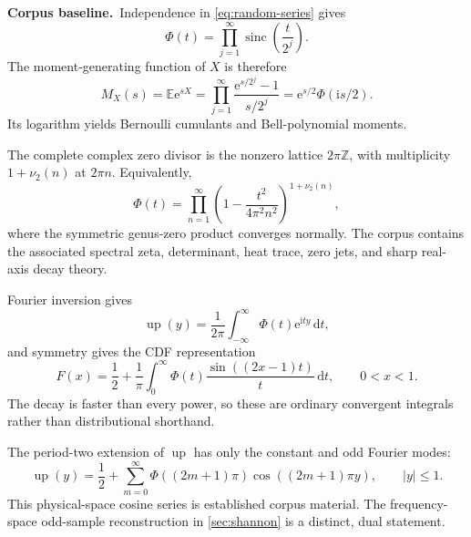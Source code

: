 \documentclass[11pt,oneside]{article}
\theoremstyle{definition}
\theoremstyle{remark}
\newcommand{\Z}{\mathbb Z}
\newcommand{\E}{\mathbb E}
\newcommand{\Up}{\operatorname{up}}
\newcommand{\sinc}{\operatorname{sinc}}
\newcommand{\dd}{\,\mathrm d}
\newcommand{\ii}{\mathrm i}
\newcommand{\e}{\mathrm e}
\newcommand{\vtwo}{\nu_2}
\newcommand{\1}{\mathbf 1}
\newcommand{\baseline}{\textcolor{linkblue}{\textbf{Corpus baseline.}}\ }
\begin{document}
\baseline Independence in \eqref{eq:random-series} gives
\begin{equation}
 \boxed{\displaystyle
 \Phi(t)=\prod_{j=1}^\infty\sinc\!\left(\frac{t}{2^j}\right).}
                                                               \label{eq:sinc-product}
\end{equation}
The moment-generating function of $X$ is therefore
\begin{equation}
 M_X(s)=\E\e^{sX}
 =\prod_{j=1}^\infty\frac{\e^{s/2^j}-1}{s/2^j}
 =\e^{s/2}\Phi(\ii s/2).                                \label{eq:mgf-product}
\end{equation}
Its logarithm yields Bernoulli cumulants and Bell-polynomial moments.

The complete complex zero divisor is the nonzero lattice $2\pi\Z$, with
multiplicity $1+\vtwo(n)$ at $2\pi n$.  Equivalently,
\begin{equation}
 \Phi(t)=\prod_{n=1}^\infty
 \left(1-\frac{t^2}{4\pi^2n^2}\right)^{1+\vtwo(n)},     \label{eq:canonical-product}
\end{equation}
where the symmetric genus-zero product converges normally.  The corpus
contains the associated spectral zeta, determinant, heat trace, zero jets,
and sharp real-axis decay theory.

Fourier inversion gives
\begin{equation}
 \Up(y)=\frac1{2\pi}\int_{-\infty}^{\infty}
          \Phi(t)\e^{\ii ty}\dd t,                       \label{eq:up-fourier-inversion}
\end{equation}
and symmetry gives the CDF representation
\begin{equation}
 F(x)=\frac12+\frac1\pi\int_0^\infty
       \Phi(t)\frac{\sin((2x-1)t)}{t}\dd t,
 \qquad 0<x<1.                                           \label{eq:F-sine-integral}
\end{equation}
The decay is faster than every power, so these are ordinary convergent
integrals rather than distributional shorthand.

The period-two extension of $\Up$ has only the constant and odd Fourier modes:
\begin{equation}
 \Up(y)=\frac12+\sum_{m=0}^\infty
   \Phi((2m+1)\pi)\cos((2m+1)\pi y),\qquad |y|\le1.      \label{eq:physical-cosine-series}
\end{equation}
This physical-space cosine series is established corpus material.  The
frequency-space odd-sample reconstruction in \cref{sec:shannon} is a distinct,
dual statement.
\end{document}
